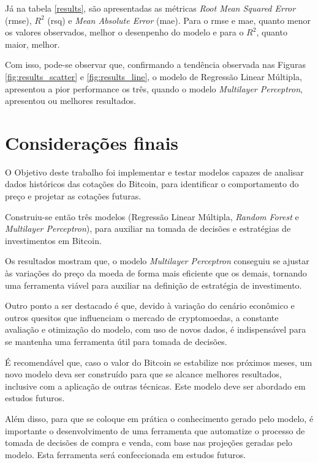 \documentclass[12pt]{article}
\begin{document}
Já na tabela \ref{results}, são apresentadas as métricas \textit{Root Mean 
Squared Error} (rmse), $R^{2}$ (rsq) e \textit{Mean Absolute Error} (mae). Para o 
rmse e mae, quanto menor os valores observados, melhor o desenpenho do modelo e 
para o $R^{2}$, quanto maior, melhor.

Com isso, pode-se observar que, confirmando a tendência observada nas Figuras 
\ref{fig:results_scatter} e \ref{fig:results_line}, o modelo de Regressão Linear
Múltipla, apresentou a pior performance os três, quando o modelo \textit{Multilayer
Perceptron}, apresentou ou melhores resultados.



\section{Considerações finais}

O Objetivo deste trabalho foi implementar e testar modelos capazes de analisar 
dados históricos das cotações do Bitcoin, para identificar o comportamento do 
preço e projetar as cotações futuras.

Construiu-se então três modelos (Regressão Linear Múltipla, \textit{Random Forest}
e \textit{Multilayer Perceptron}), para auxiliar na tomada de decisões e 
estratégias de investimentos em Bitcoin. 

Os resultados mostram que, o modelo \textit{Multilayer Perceptron} conseguiu se
ajustar às variações do preço da moeda de forma mais eficiente que os demais, 
tornando uma ferramenta viável para auxiliar na definição de estratégia de 
investimento.

Outro ponto a ser destacado é que, devido à variação do cenário econômico e outros
quesitos que influenciam o mercado de cryptomoedas, a constante avaliação e
otimização do modelo, com uso de novos dados, é indispensável para se mantenha
uma ferramenta útil para tomada de decisões.

É recomendável que, caso o valor do Bitcoin se estabilize nos próximos meses, um
novo modelo deva ser construído para que se alcance melhores resultados, inclusive
com a aplicação de outras técnicas. Este modelo deve ser abordado em estudos 
futuros.

Além disso, para que se coloque em prática o conhecimento gerado pelo modelo, é
importante o desenvolvimento de uma ferramenta que automatize o processo de 
tomada de decisões de compra e venda, com base nas projeções geradas pelo modelo.
Esta ferramenta será confeccionada em estudos futuros.

\clearpage



\end{document}
